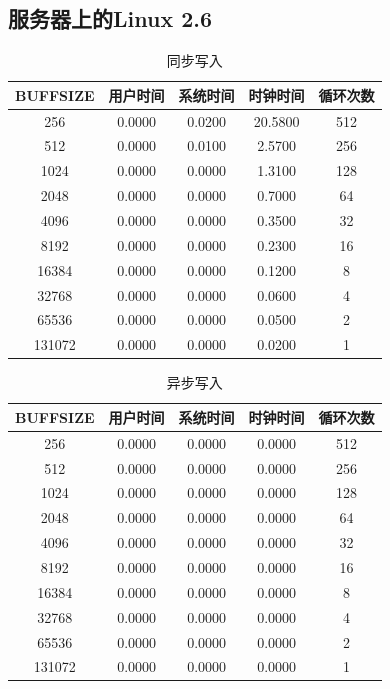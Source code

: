 \documentclass[a4paper,twoside]{article}
\begin{document}
\begin{spacing}{1.2}
\subsection{服务器上的Linux 2.6}



\begin{table}[H]
\centering
\caption{同步写入}
\begin{tabular}{c|c|c|c|c}
	\toprule
	\hline
	BUFFSIZE & 用户时间 & 系统时间 & 时钟时间 & 循环次数 \\
	\hline
	256    &  0.0000 & 0.0200 &20.5800 &512
	\\512    &  0.0000 & 0.0100 & 2.5700 &256
	\\1024   &  0.0000 & 0.0000 & 1.3100 &128
	\\2048   &  0.0000 & 0.0000 & 0.7000 &64
	\\4096   &  0.0000 & 0.0000 & 0.3500 &32
	\\8192   &  0.0000 & 0.0000 & 0.2300 &16
	\\16384  &  0.0000 & 0.0000 & 0.1200 &8
	\\32768  &  0.0000 & 0.0000 & 0.0600 &4
	\\65536  &  0.0000 & 0.0000 & 0.0500 &2
	\\131072 &  0.0000 & 0.0000 & 0.0200 &1
	\\\hline
	\bottomrule
\end{tabular}	
\end{table}

\begin{table}[H]
\centering
\caption{异步写入}
\begin{tabular}{c|c|c|c|c}
	\toprule
	\hline
	BUFFSIZE & 用户时间 & 系统时间 & 时钟时间 & 循环次数 \\
	\hline
	256     & 0.0000 & 0.0000 & 0.0000 & 512
	\\512     & 0.0000 & 0.0000 & 0.0000 & 256
	\\1024    & 0.0000 & 0.0000 & 0.0000 & 128
	\\2048    & 0.0000 & 0.0000 & 0.0000 & 64
	\\4096    & 0.0000 & 0.0000 & 0.0000 & 32
	\\8192    & 0.0000 & 0.0000 & 0.0000 & 16
	\\16384   & 0.0000 & 0.0000 & 0.0000 & 8
	\\32768   & 0.0000 & 0.0000 & 0.0000 & 4
	\\65536   & 0.0000 & 0.0000 & 0.0000 & 2
	\\131072  & 0.0000 & 0.0000 & 0.0000 & 1
	\\\hline
	\bottomrule
\end{tabular}	
\end{table}

\end{spacing}
\end{document}
